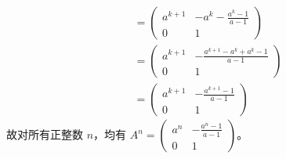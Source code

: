 \begin{questions}
\begin{parts}
\begin{solution}
\begin{align*}
&= \begin{pmatrix} a^{k+1} & -a^k - \frac{a^k - 1}{a - 1} \\ 0 & 1 \end{pmatrix} \\
&= \begin{pmatrix} a^{k+1} & -\frac{a^{k+1} - a^k + a^k - 1}{a - 1} \\ 0 & 1 \end{pmatrix} \\
&= \begin{pmatrix} a^{k+1} & -\frac{a^{k+1} - 1}{a - 1} \\ 0 & 1 \end{pmatrix}
\end{align*}
故对所有正整数 $n$，均有 $A^n = \begin{pmatrix} a^n & -\frac{a^n - 1}{a - 1} \\ 0 & 1 \end{pmatrix}$。
\end{solution}


\end{parts}
\end{questions}
